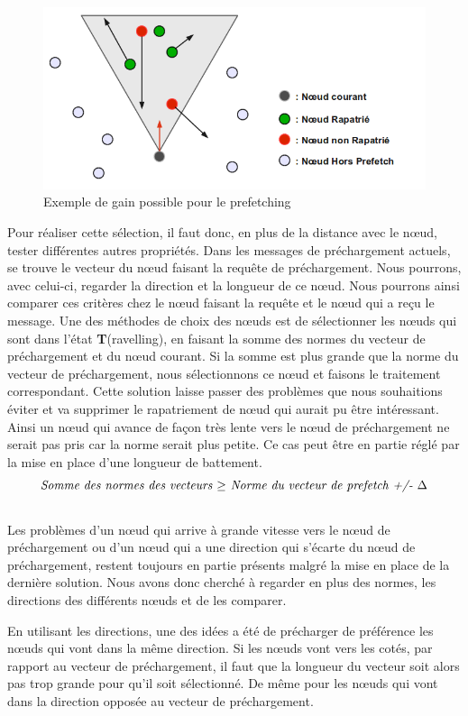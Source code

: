 	\begin{figure}[!h]
        \centering
        \includegraphics[scale=0.45]{./Ressources/Images/prefetchaV1.png}
        \caption{Exemple de gain possible pour le prefetching}
        \label{prefetchav}
        \end{figure}

\par Pour réaliser cette sélection, il faut donc, en plus de la distance avec le nœud, tester différentes autres propriétés. Dans les messages de préchargement actuels, se trouve le vecteur du nœud faisant la requête de préchargement. Nous pourrons, avec celui-ci, regarder la direction et la longueur de ce nœud. Nous pourrons ainsi comparer ces critères chez le nœud faisant la requête et le nœud qui a reçu le message. Une des méthodes de choix des nœuds est de sélectionner les nœuds qui sont dans l'état \textbf{T}(ravelling), en faisant la somme des normes du vecteur de préchargement et du nœud courant. Si la somme est plus grande que la norme du vecteur de préchargement, nous sélectionnons ce nœud et faisons le traitement correspondant. Cette solution laisse passer des problèmes que nous souhaitions éviter et va supprimer le rapatriement de nœud qui aurait pu être intéressant. Ainsi un nœud qui avance de façon très lente vers le nœud de préchargement ne serait pas pris car la norme serait plus petite. Ce cas peut être en partie réglé par la mise en place d'une longueur de battement.
\newline
$$\\\textit{Somme des normes des vecteurs~$\ge$~Norme du vecteur de prefetch +/- $\Delta$}$$
\\Les problèmes d'un nœud qui arrive à grande vitesse vers le nœud de préchargement ou d'un nœud qui a une direction qui s'écarte du nœud de préchargement, restent toujours en partie présents malgré la mise en place de la dernière solution. Nous avons donc cherché à regarder en plus des normes, les directions des différents nœuds et de les comparer.
\par En utilisant les directions, une des idées a été de précharger de préférence les nœuds qui vont dans la même direction. Si les nœuds vont vers les cotés, par rapport au vecteur de préchargement, il faut que la longueur du vecteur soit alors pas trop grande pour qu'il soit sélectionné. De même pour les nœuds qui vont dans la direction opposée au vecteur de préchargement.


